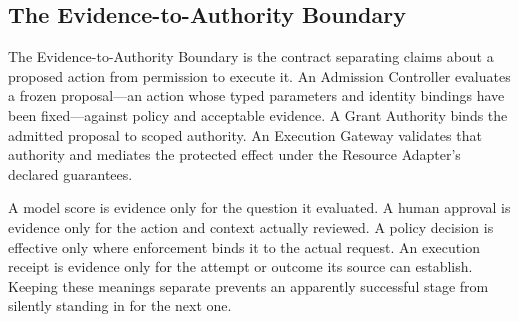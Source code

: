 \subsection{The Evidence-to-Authority Boundary}
\begin{definition}
The Evidence-to-Authority Boundary is the contract separating claims about a proposed action from permission to execute it. An Admission Controller evaluates a frozen proposal---an action whose typed parameters and identity bindings have been fixed---against policy and acceptable evidence. A Grant Authority binds the admitted proposal to scoped authority. An Execution Gateway validates that authority and mediates the protected effect under the Resource Adapter's declared guarantees.
\end{definition}

A model score is evidence only for the question it evaluated. A human approval is evidence only for the action and context actually reviewed. A policy decision is effective only where enforcement binds it to the actual request. An execution receipt is evidence only for the attempt or outcome its source can establish. Keeping these meanings separate prevents an apparently successful stage from silently standing in for the next one.

\clearpage
